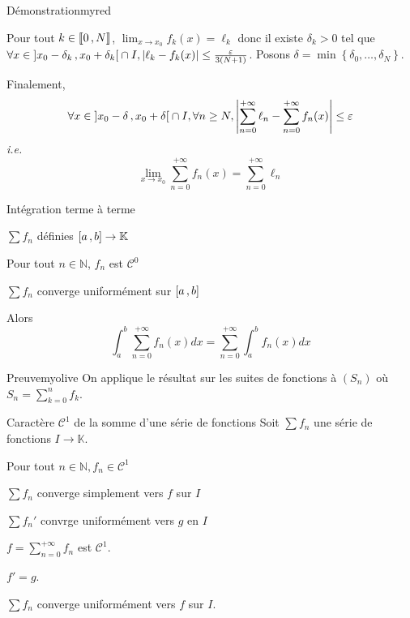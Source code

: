 \begin{demo}{Démonstration}{myred}
\begin{itemize}
            Pour tout $k \in \left\llbracket 0 \, , N \right\rrbracket$, $\lim_{x \to x_0} f_k(x) = \ell_k$ donc il existe $\delta_k > 0$ tel que $\forall x \in \left] x_0 - \delta_k \, , x_0 + \delta_k \right[ \cap I, \left\lvert \ell_k - f_k(x)\right\rvert \leq \frac{\varepsilon}{3(N+1)}$. Posons $\delta = \min\left\{ \delta_0, \ldots, \delta_N \right\}$.

            Finalement, 
            \[ \forall x \in \left] x_0 - \delta \, , x_0 + \delta \right[ \cap I, \forall n \geq N, \left\lvert \sum_{n=0}^{+\infty} \ell_n - \sum_{n=0}^{+\infty} f_n(x)\right\rvert \leq \varepsilon \]   
            \textit{i.e.}
            \[ \lim_{x \to x_0} \sum_{n=0}^{+\infty} f_n(x) = \sum_{n=0}^{+\infty} \ell_n \]
        \end{itemize}
    \end{demo}

    \begin{prop}{Intégration terme à terme}{}
        \begin{soient}
            \item $\sum f_n$ définies $\left[ a \, , b \right] \to \mathbb{K}$
        \end{soient}
        \begin{suppose}
            \item Pour tout $n \in \mathbb{N}$, $f_n$ est $\mathcal{C}^0$
            \item $\sum f_n$ converge uniformément sur $\left[ a \, , b \right]$
        \end{suppose}
        Alors 
        \[ \int_{a}^{b} \sum_{n=0}^{+\infty} f_n(x) dx = \sum_{n=0}^{+\infty} \int_{a}^{b} f_n(x) dx \] 
    \end{prop}

    \begin{demo}{Preuve}{myolive}
        On applique le résultat sur les suites de fonctions à $(S_n)$ où $S_n = \sum_{k=0}^{n} f_k$.
    \end{demo}

    \begin{prop}{Caractère $\mathcal{C}^1$ de la somme d’une série de fonctions}{}
        Soit $\sum f_n$ une série de fonctions $I \to \mathbb{K}$. 
        \begin{suppose}
            \item Pour tout $n \in \mathbb{N}, f_n \in \mathcal{C}^1$
            \item $\sum f_n$ converge simplement vers $f$ sur $I$
            \item $\sum f_n'$ convrge uniformément vers $g$ en $I$
        \end{suppose}
        \begin{alors}
            \item $f = \sum_{n=0}^{+\infty} f_n$ est $\mathcal{C}^1$.
            \item $f' = g$.
            \item $\sum f_n$ converge uniformément vers $f$ sur $I$.
        \end{alors}
    \end{prop}

